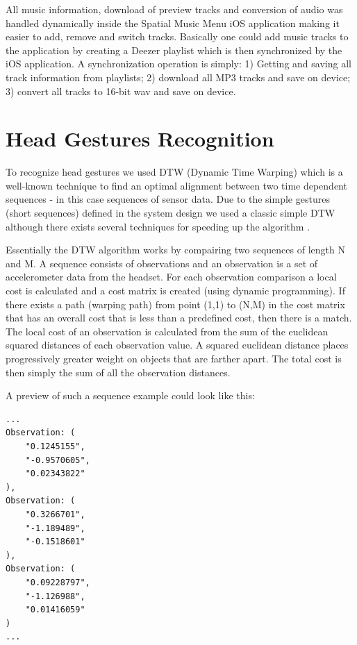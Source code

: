 All music information, download of preview tracks and conversion of audio was handled dynamically inside the Spatial Music Menu iOS application making it easier to add, remove and switch tracks. Basically one could add music tracks to the application by creating a Deezer playlist which is then synchronized by the iOS application. A synchronization operation is simply: 1) Getting and saving all track information from playlists; 2) download all MP3 tracks and save on device; 3) convert all tracks to 16-bit wav and save on device.


\section{Head Gestures Recognition}
\label{sec:implementationgesturerecognition}
To recognize head gestures we used DTW (Dynamic Time Warping) which is a well-known technique to find an optimal alignment between two time dependent sequences \cite{muller_dynamic_2007} - in this case sequences of sensor data. Due to the simple gestures (short sequences) defined in the system design we used a classic simple DTW although there exists several techniques for speeding up the algorithm \cite{muller_dynamic_2007,salvador_toward_2007,akl_accelerometer-based_2010}. 

Essentially the DTW algorithm works by compairing two sequences of length N and M. A sequence consists of observations and an observation is a set of accelerometer data from the headset. For each observation comparison a local cost is calculated and a cost matrix is created (using dynamic programming). If there exists a path (warping path) from point (1,1) to (N,M) in the cost matrix that has an overall cost that is less than a predefined cost, then there is a match. The local cost of an observation is calculated from the sum of the euclidean squared distances of each observation value. A squared euclidean distance places progressively greater weight on objects that are farther apart. The total cost is then simply the sum of all the observation distances.

A preview of such a sequence example could look like this:

\begin{lstlisting}
...
Observation: (
    "0.1245155",
    "-0.9570605",
    "0.02343822"
),
Observation: (
    "0.3266701",
    "-1.189489",
    "-0.1518601"
),
Observation: (
    "0.09228797",
    "-1.126988",
    "0.01416059"
)
...
\end{lstlisting}

